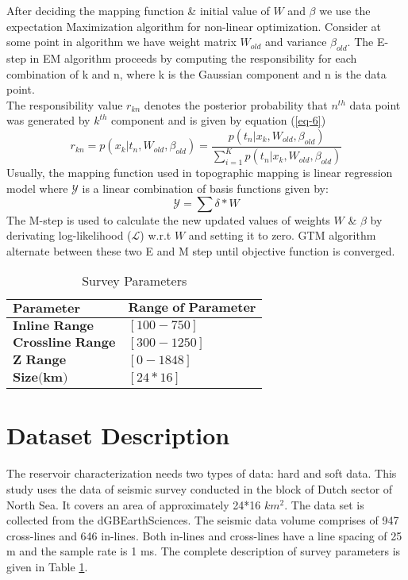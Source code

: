 \documentclass[a4paper]{article}
\begin{document}
After deciding the mapping function \& initial value of $W$ and $\beta$ we use the expectation Maximization\cite{em} algorithm for non-linear optimization. Consider at some point in algorithm we have weight matrix $W_{old}$ and variance $\beta_{old}$. The E-step in EM algorithm proceeds by computing the responsibility for each combination of k and n, where k is the Gaussian component and n is the data point\cite{gtm1}.\\
The responsibility value $r_{kn}$ denotes the posterior probability that $n^{th}$ data point was generated by $k^{th}$ component and is given by equation (\ref{eq-6})\\
\begin{equation}
r_{kn}=p(x_{k}|t_{n},W_{old},\beta_{old})=\frac{p(t_{n}|x_{k},W_{old},\beta_{old})}{\sum\limits_{i=1}^{K}p(t_{n}|x_{k},W_{old},\beta_{old})} \label{eq-6}
\end{equation}
Usually, the mapping function used in topographic mapping is linear regression model where $\mathcal{Y}$ is a linear combination of basis functions given by:
\begin{equation}
\mathcal{Y}=\sum \delta* W \label{eq-7}
\end{equation}
The M-step is used to calculate the new updated values of weights $W$ \& $\beta$ by derivating log-likelihood ($\mathcal{L}$) w.r.t $W$ and setting it to zero. GTM algorithm alternate between these two E and M step until objective function is converged\cite{gtm1}.
\begin{table}[htbp]
\caption{Survey Parameters}
\label{tab}      
\centering
\renewcommand{\arraystretch}{1.5}
\begin{tabular}[5cm]{|p{3cm}|p{4cm}|}
\hline
$\textbf{Parameter}$ & $\textbf{Range of Parameter}$\\
\hline
$\textbf{Inline Range}$ & $[100-750] $\\
\hline
$\textbf{Crossline Range}$ & $[300-1250]$\\
\hline
$\textbf{Z Range}$ & $[0-1848]$\\
\hline
$\textbf{Size(km)}$ & $[24*16]$\\
\hline
\end{tabular}
\end{table}
\section{Dataset Description}
The reservoir characterization needs two types of data: hard and soft data. This study uses the data of seismic survey conducted in the block of Dutch sector of North Sea\cite{gt}. It covers an area of approximately 24*16 $km^{2}$. The data set is collected from the dGBEarthSciences. The seismic data volume comprises of 947 cross-lines and 646 in-lines. Both in-lines and cross-lines have a line spacing of 25 m and the sample rate is 1 ms. The complete description of survey parameters is given in Table \ref{tab}.
\end{document}
